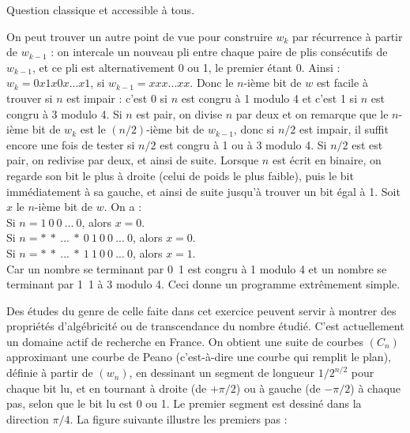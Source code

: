 

\Q
Question classique et accessible à tous.



\Q
On peut trouver un autre point de vue pour construire $w_k$ par récurrence à partir de $w_{k-1}$ : on intercale un nouveau pli entre chaque paire de plis consécutifs de $w_{k-1}$, et ce pli est alternativement 0 ou 1, le premier étant 0. Ainsi : $w_k=0x1x0x...x1$, si $w_{k-1}=xxx...xx$. Donc le $n$-ième bit de $w$ est facile à trouver si $n$ est impair : c'est 0 si $n$ est congru à 1 modulo 4 et c'est 1 si $n$ est congru à 3 modulo 4. Si $n$ est pair, on divise $n$ par deux et on remarque que le $n$-ième bit de $w_k$ est le $(n/2)$-ième bit de $w_{k-1}$, donc si $n/2$ est impair, il suffit encore une fois de tester si $n/2$ est congru à 1 ou à 3 modulo 4. Si $n/2$ est est pair, on redivise par deux, et ainsi de suite. Lorsque $n$ est écrit en binaire, on regarde son bit le plus à droite (celui de poids le plus faible), puis le bit immédiatement à sa gauche, et ainsi de suite jusqu'à trouver un bit égal à 1. Soit $x$ le $n$-ième bit de $w$. On a :\\
Si $n=1~0~0~...~0$, alors $x=0$.\\
Si $n=*~*~...~*~0~1~0~0~...~0$, alors $x=0$.\\
Si $n=*~*~...~*~1~1~0~0~...~0$, alors $x=1$.\\
Car un nombre se terminant par 0~1 est congru à 1 modulo 4 et un nombre se terminant par 1~1 à 3 modulo 4.
Ceci donne un programme extrêmement simple.


\medskip

Des études du genre de celle faite dans cet exercice peuvent servir à montrer des propriétés d'algébricité ou de transcendance du nombre étudié. C'est actuellement un domaine actif de recherche en France. On obtient une suite de courbes $(C_n)$ approximant une courbe de Peano (c'est-à-dire une courbe qui remplit le plan), définie à partir de $(w_n)$, en dessinant un segment de longueur $1/2^{n/2}$ pour chaque bit lu, et en tournant à droite (de $+\pi/2$) ou à gauche (de $-\pi/2$) à chaque pas, selon que le bit lu est 0 ou 1. Le premier segment est dessiné dans la direction $\pi/4$. La figure suivante illustre les premiers pas :

